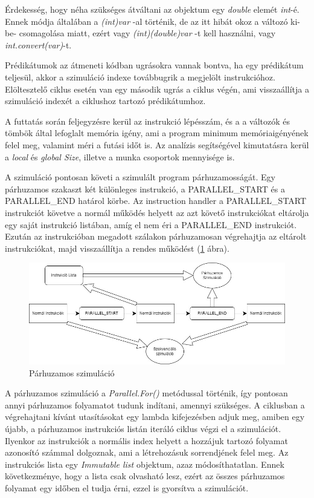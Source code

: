 Érdekesség, hogy néha szükséges átváltani az objektum egy \textit{double} elemét \textit{int}-é. Ennek módja általában a \textit{(int)var} -al történik, de az itt hibát okoz a változó ki-be- csomagolása miatt, ezért vagy \textit{(int)(double)var} -t kell használni, vagy \textit{int.convert(var)}-t.

Prédikátumok az átmeneti kódban ugrásokra vannak bontva, ha egy prédikátum teljesül, akkor a szimuláció indexe továbbugrik a megjelölt instrukcióhoz. Elöltesztelő ciklus esetén van egy második ugrás a ciklus végén, ami visszaállítja a szimuláció indexét a ciklushoz tartozó prédikátumhoz.

A futtatás során feljegyzésre kerül az instrukció lépésszám, és a a változók és tömbök által lefoglalt memória igény, ami a program minimum memóriaigényének felel meg, valamint méri a futási időt is. Az analízis segítségével kimutatásra kerül a \textit{local} és \textit{global Size}, illetve a munka csoportok mennyisége is. 



A szimuláció pontosan követi a szimulált program párhuzamosságát. Egy párhuzamos szakaszt két különleges instrukció, a PARALLEL{\_}START és a PARALLEL{\_}END határol körbe. Az instruction handler a PARALLEL{\_}START instrukciót követve a normál működés helyett az azt követő instrukciókat eltárolja egy saját instrukció listában, amíg el nem éri a PARALLEL{\_}END instrukciót. Ezután az instrukcióban megadott szálakon párhuzamosan végrehajtja az eltárolt instrukciókat, majd visszaállítja a rendes működést (\ref{fig:parallelSim} ábra).


\begin{figure}[h]
\centering
\includegraphics[width=\textwidth]{images/Parallel_Simulation.jpg}
\caption{Párhuzamos szimuláció}
\label{fig:parallelSim}
\end{figure}


A párhuzamos szimuláció a \textit{Parallel.For()} \cite{pfor} metódussal történik, így pontosan annyi párhuzamos folyamatot tudunk indítani, amennyi szükséges. A ciklusban a végrehajtani kívánt utasításokat egy lambda kifejezésben adjuk meg, amiben egy újabb, a párhuzamos instrukciós listán iteráló ciklus végzi el a szimulációt. Ilyenkor az instrukciók a normális index helyett a hozzájuk tartozó folyamat azonosító számmal dolgoznak, ami a létrehozásuk sorrendjének felel meg. Az instrukciós lista egy \textit{Immutable list} objektum, azaz módosíthatatlan. Ennek következménye, hogy a lista csak olvasható lesz, ezért az összes párhuzamos folyamat egy időben el tudja érni, ezzel is gyorsítva a szimulációt.

